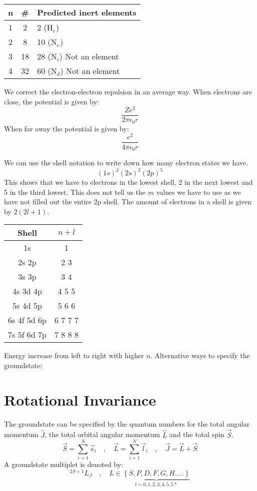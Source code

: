\documentclass{article}
\begin{document}
\begin{tabular}{ c|c|l }
\hline
n &\# &Predicted inert elements \\
\hline
1 &2 &2 (H$_{e}$) \\
\hline
2 &8 &10 (N$_{e}$) \\
\hline
3 &18 &28 (N$_i$) Not an element \\
\hline
4 &32 &60 (N$_d$) Not an element \\
\hline
\end{tabular}

We correct the electron-electron repulsion in an average way. When electrons are close, the potential is given by:
\[
\frac{Ze^2}{2πϵ_0 r}
\]
When far away the potential is given by:
\[
\frac{e^2}{4πϵ_0 r}
\]

We can use the shell notation to write down how many electron states we have. 
\[
(1s)^2 (2s)^2 (2p)^{5}
\]
This shows that we have to electrons in the lowest shell, 2 in the next lowest and 5 in the third lowest. This does not tell us the $m$ values we have to use as we have not filled out the entire 2p shell. The amount of electrons in a shell is given by $2(2l+1)$. 


\begin{tabular}{ c|c }
Shell &$n+l$ \\
\hline
1s &1 \\
\hline
2s 2p &2 3 \\
\hline
3s 3p &3 4 \\
\hline
4s 3d 4p &4 5 5 \\
\hline
5s 4d 5p &5 6 6 \\
\hline
6s 4f 5d 6p &6 7 7 7 \\
\hline
7s 5f 6d 7p &7 8 8 8 \\
\end{tabular}

Energy increase from left to right with higher $n$. Alternative ways to specify the groundstate:
\section*{Rotational Invariance}
The groundstate can be specified by the quantum numbers for the total angular momentum $\hat{J}$, the total orbital angular momentum $\hat{L}$ and the total spin $\vec{S}$.
\[
\vec{S} = ∑_{i=1}^{N} \vec{s}_i \quad , \quad \vec{L} = ∑_{i=1}^{N} \vec{l}_i \quad , \quad \vec{J} = \vec{L} + \vec{S}
\]
A groundstate multiplet is denoted by:
\[
^{2S+1}L_J \quad , \quad L ∈ \underbrace{\left\{S,P,D,F,G,H, \ldots  \right\}}_{l = 0, 1, 2, 3, 4, 5, 5*}
\]
\end{document}
